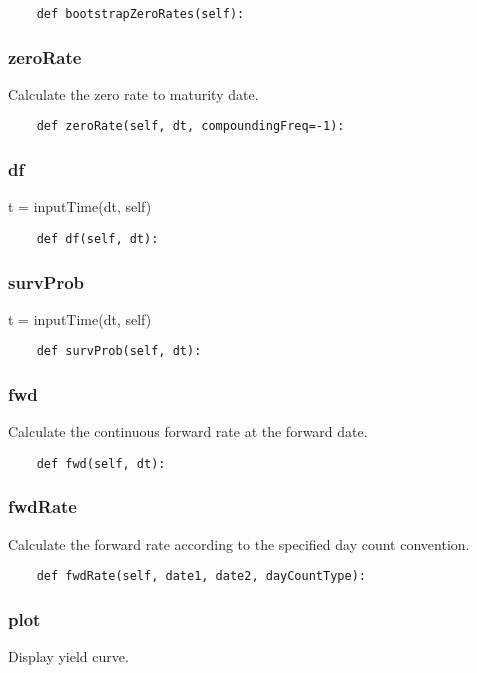 \documentclass[twoside,11pt]{book}
\begin{document}
\begin{lstlisting}
    def bootstrapZeroRates(self):
\end{lstlisting}

\subsubsection*{{\bf zeroRate}}
Calculate the zero rate to maturity date.  

\begin{lstlisting}
    def zeroRate(self, dt, compoundingFreq=-1):
\end{lstlisting}

\subsubsection*{{\bf df}}
t = inputTime(dt, self) 

\begin{lstlisting}
    def df(self, dt):
\end{lstlisting}

\subsubsection*{{\bf survProb}}
t = inputTime(dt, self) 

\begin{lstlisting}
    def survProb(self, dt):
\end{lstlisting}

\subsubsection*{{\bf fwd}}
Calculate the continuous forward rate at the forward date.  

\begin{lstlisting}
    def fwd(self, dt):
\end{lstlisting}

\subsubsection*{{\bf fwdRate}}
Calculate the forward rate according to the specified day count convention.  

\begin{lstlisting}
    def fwdRate(self, date1, date2, dayCountType):
\end{lstlisting}

\subsubsection*{{\bf plot}}
Display yield curve.  
\end{document}
